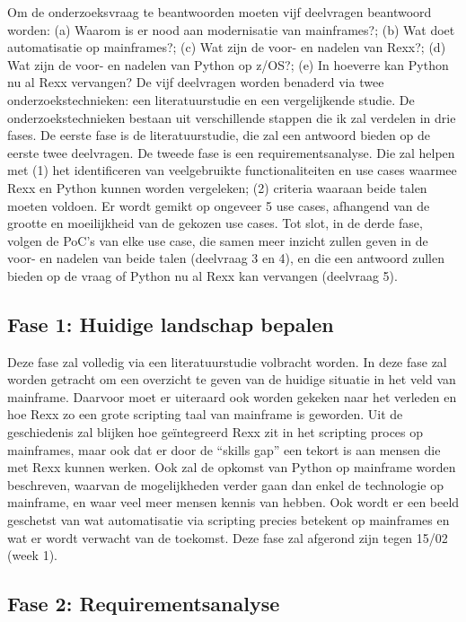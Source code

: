 Om de onderzoeksvraag te beantwoorden moeten vijf deelvragen beantwoord worden: (a) Waarom is er nood aan modernisatie van mainframes?; (b) Wat doet automatisatie op mainframes?; (c) Wat zijn de voor- en nadelen van Rexx?; (d) Wat zijn de voor- en nadelen van Python op z/OS?; (e) In hoeverre kan Python nu al Rexx vervangen? De vijf deelvragen worden benaderd via twee onderzoekstechnieken: een literatuurstudie en een vergelijkende studie. De onderzoekstechnieken bestaan uit verschillende stappen die ik zal verdelen in drie fases. De eerste fase is de literatuurstudie, die zal een antwoord bieden op de eerste twee deelvragen. De tweede fase is een requirementsanalyse. Die zal helpen met (1) het identificeren van veelgebruikte functionaliteiten en use cases waarmee Rexx en Python kunnen worden vergeleken; (2) criteria waaraan beide talen moeten voldoen. Er wordt gemikt op ongeveer 5 use cases, afhangend van de grootte en moeilijkheid van de gekozen use cases. Tot slot, in de derde fase, volgen de PoC's van elke use case, die samen meer inzicht zullen geven in de voor- en nadelen van beide talen (deelvraag 3 en 4), en die een antwoord zullen bieden op de vraag of Python nu al Rexx kan vervangen (deelvraag 5).

\subsection{Fase 1: Huidige landschap bepalen}

Deze fase zal volledig via een literatuurstudie volbracht worden. In deze fase zal worden getracht om een overzicht te geven van de huidige situatie in het veld van mainframe. Daarvoor moet er uiteraard ook worden gekeken naar het verleden en hoe Rexx zo een grote scripting taal van mainframe is geworden. Uit de geschiedenis zal blijken hoe geïntegreerd Rexx zit in het scripting proces op mainframes, maar ook dat er door de “skills gap” een tekort is aan mensen die met Rexx kunnen werken. Ook zal de opkomst van Python op mainframe worden beschreven, waarvan de mogelijkheden verder gaan dan enkel de technologie op mainframe, en waar veel meer mensen kennis van hebben. Ook wordt er een beeld geschetst van wat automatisatie via scripting precies betekent op mainframes en wat er wordt verwacht van de toekomst. Deze fase zal afgerond zijn tegen 15/02 (week 1).

\subsection{Fase 2: Requirementsanalyse}

